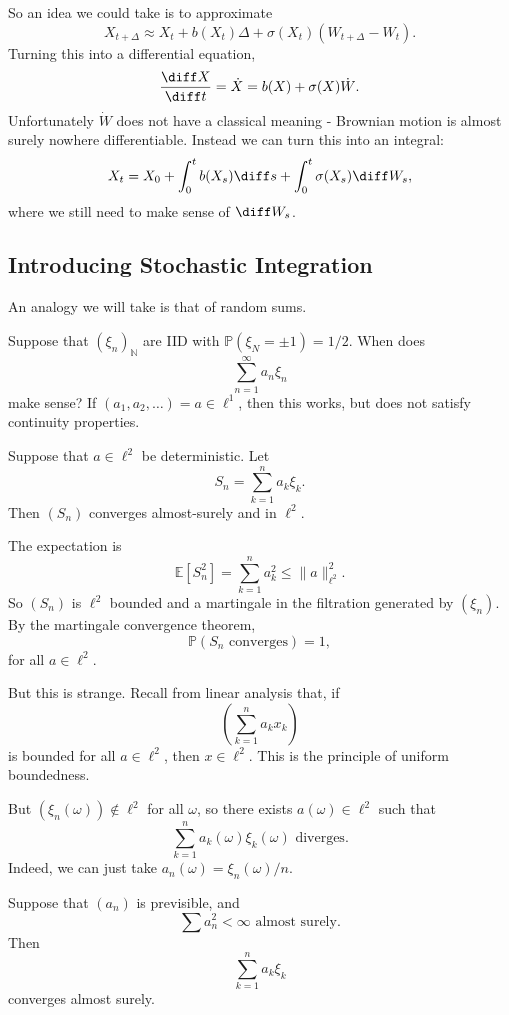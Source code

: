 \documentclass[12pt]{article}
\begin{document}
So an idea we could take is to approximate
\[
X_{t + \Delta} \approx X_t + b(X_t) \Delta + \sigma(X_t) (W_{t + \Delta} - W_t).
\]
Turning this into a differential equation,
\[
\frac{\diff X}{\diff t} = \dot X = b(X) + \sigma(X) \dot W.
\]
Unfortunately $\dot W$ does not have a classical meaning - Brownian motion is almost surely nowhere differentiable. Instead we can turn this into an integral:
\[
X_t = X_0 + \int_0^t b(X_s) \diff s + \int_0^t \sigma(X_s) \diff W_s,
\]
where we still need to make sense of $\diff W_s$.

\subsection{Introducing Stochastic Integration}%
\label{sub:isi}

An analogy we will take is that of random sums.

Suppose that $(\xi_n)_{\mathbb{N}}$ are IID with $\mathbb{P}(\xi_N = \pm 1) = 1/2$. When does
\[
\sum_{n = 1}^\infty a_n \xi_n
\]
make sense? If $(a_1, a_2, \ldots) = a \in \ell^1$, then this works, but does not satisfy continuity properties.

\begin{proposition}
	Suppose that $a \in \ell^2$ be deterministic. Let
	\[
	S_n = \sum_{k = 1}^n a_k \xi_k.
	\]
	Then $(S_n)$ converges almost-surely and in $\ell^2$.
\end{proposition}

\begin{proofbox}
	The expectation is
	\[
	\mathbb{E}[S_n^2] = \sum_{k = 1}^n a_k^2 \leq \|a\|_{\ell^2}^2.
	\]
	So $(S_n)$ is $\ell^2$ bounded and a martingale in the filtration generated by $(\xi_n)$. By the martingale convergence theorem,
	\[
		\mathbb{P}(S_n \text{ converges}) = 1,
	\]
	for all $a \in \ell^2$.
\end{proofbox}

But this is strange. Recall from linear analysis that, if
\[
	\left(\sum_{k = 1}^n a_k x_k\right)
\]
is bounded for all $a \in \ell^2$, then $x \in \ell^2$. This is the principle of uniform boundedness.

But $(\xi_n(\omega)) \not \in \ell^2$ for all $\omega$, so there exists $a(\omega) \in \ell^2$ such that
\[
	\sum_{k = 1}^n a_k(\omega) \xi_k(\omega) \text{ diverges}.
\]
Indeed, we can just take $a_n(\omega) = \xi_n(\omega)/n$.
\begin{theorem}
	Suppose that $(a_n)$ is previsible, and
	\[
		\sum a_n^2 < \infty \text{ almost surely}.
	\]
	Then
	\[
	\sum_{k = 1}^n a_k \xi_k
	\]
	converges almost surely.
\end{theorem}
\end{document}
